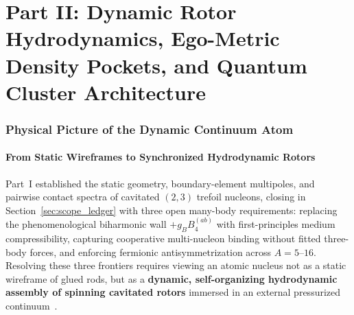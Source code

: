 \documentclass[11pt, a4paper]{article}
\begin{document}

\newpage
\part*{Part II: Dynamic Rotor Hydrodynamics, Ego-Metric Density Pockets, and Quantum Cluster Architecture}

\section{Physical Picture of the Dynamic Continuum Atom}
\label{sec:dynamic_picture}

\subsection{From Static Wireframes to Synchronized Hydrodynamic Rotors}
Part~I established the static geometry, boundary-element multipoles, and pairwise contact spectra of cavitated $(2,3)$ trefoil nucleons, closing in Section~\ref{sec:scope_ledger} with three open many-body requirements: replacing the phenomenological biharmonic wall $+g_B B_4^{(ab)}$ with first-principles medium compressibility, capturing cooperative multi-nucleon binding without fitted three-body forces, and enforcing fermionic antisymmetrization across $A = 5\text{--}16$. Resolving these three frontiers requires viewing an atomic nucleus not as a static wireframe of glued rods, but as a \textbf{dynamic, self-organizing hydrodynamic assembly of spinning cavitated rotors} immersed in an external pressurized continuum~\cite{bairmosheh2026,bairmosheh2026b}.
\end{document}
